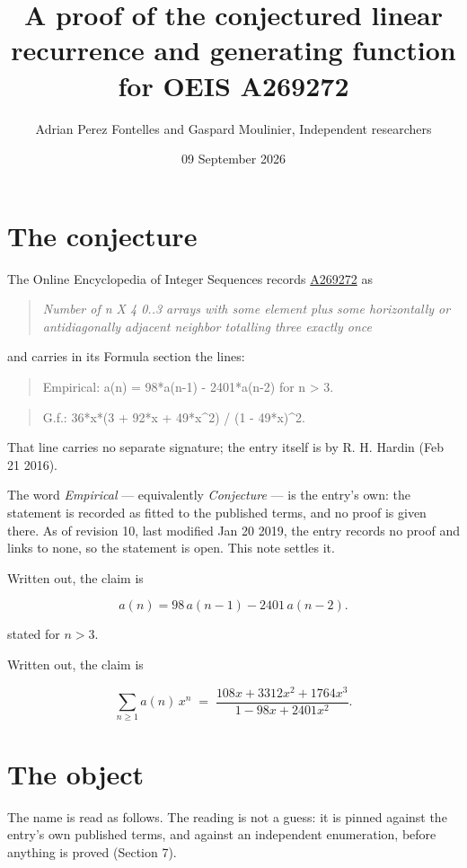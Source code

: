 \documentclass[11pt]{article}
\title{A proof of the conjectured linear recurrence and generating function for OEIS A269272}
\author{Adrian Perez Fontelles and Gaspard Moulinier, Independent researchers}
\date{09 September 2026}
\theoremstyle{definition}
\begin{document}
\maketitle
\section{The conjecture}

The Online Encyclopedia of Integer Sequences records \href{https://oeis.org/A269272}{A269272} as

\begin{quote}\itshape Number of n X 4 0..3 arrays with some element plus some horizontally or antidiagonally adjacent neighbor totalling three exactly once\end{quote}

and carries in its Formula section the lines:

\begin{quote}\ttfamily Empirical: a(n) = 98*a(n-1) - 2401*a(n-2) for n > 3.\end{quote}

\begin{quote}\ttfamily G.f.: 36*x*(3 + 92*x + 49*x\textasciicircum{}2) / (1 - 49*x)\textasciicircum{}2.\end{quote}

That line carries no separate signature; the entry itself is by R. H. Hardin (Feb 21 2016).

The word {\itshape Empirical} --- equivalently {\itshape Conjecture} --- is the entry's own: the statement is recorded as fitted to the published terms, and no proof is given there. As of revision 10, last modified Jan 20 2019, the entry records no proof and links to none, so the statement is open. This note settles it.

Written out, the claim is

\[a(n) = 98\,a(n-1) - 2401\,a(n-2).\]

stated for $n > 3$.

Written out, the claim is

\[\sum_{n \ge 1} a(n)\,x^n \;=\; \frac{108x + 3312x^{2} + 1764x^{3}}{1 - 98x + 2401x^{2}}.\]

\section{The object}

The name is read as follows. The reading is not a guess: it is pinned against the entry's own published terms, and against an independent enumeration, before anything is proved (Section 7).
\end{document}

